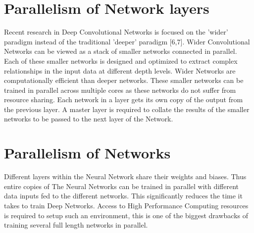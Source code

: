 \documentclass[sigconf]{acmart}
\begin{document}
\section{Parallelism of Network layers}

Recent research in Deep Convolutional Networks is focused on the 'wider' paradigm instead of the traditional 'deeper' paradigm [6,7]. Wider Convolutional Networks can be viewed as a stack of smaller networks connected in parallel. Each of these smaller networks is designed and optimized to extract complex relationships in the input data at different depth levels. Wider Networks are computationally efficient than deeper networks. These smaller networks can be trained in parallel across multiple cores as these networks do not suffer from resource sharing. Each network in a layer gets its own copy of the output from the previous layer. A master layer is required to collate the results of the smaller networks to be passed to the next layer of the Network. 

\section{Parallelism of Networks}


Different layers within the Neural Network share their weights and biases. Thus entire copies of The Neural Networks can be trained in parallel with different data inputs fed to the different networks. This significantly reduces the time it takes to train Deep Networks. Access to High Performance Computing resources is required to setup such an environment, this is one of the biggest drawbacks of training several full length networks in parallel.




 
\end{document}
